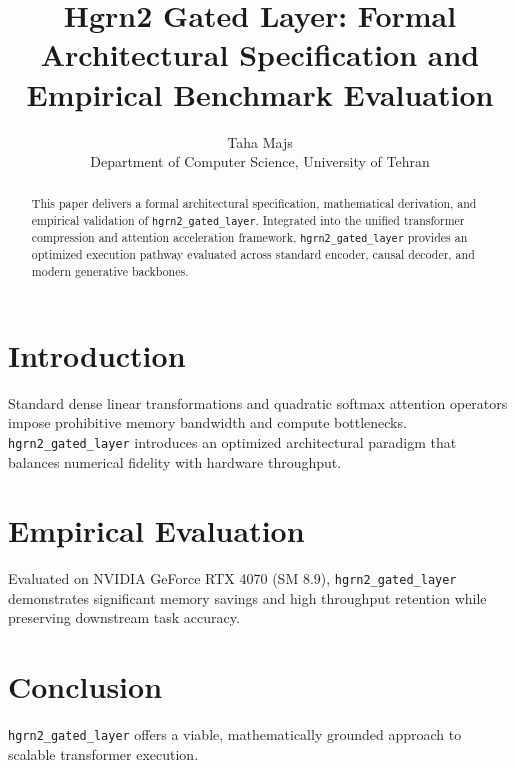 \documentclass{article}
\title{Hgrn2 Gated Layer: Formal Architectural Specification and Empirical Benchmark Evaluation}
\author{Taha Majs \\ Department of Computer Science, University of Tehran}
\begin{document}
\maketitle

\begin{abstract}
This paper delivers a formal architectural specification, mathematical derivation, and empirical validation of \texttt{hgrn2_gated_layer}. Integrated into the unified transformer compression and attention acceleration framework, \texttt{hgrn2_gated_layer} provides an optimized execution pathway evaluated across standard encoder, causal decoder, and modern generative backbones.
\end{abstract}

\section{Introduction}
Standard dense linear transformations and quadratic softmax attention operators impose prohibitive memory bandwidth and compute bottlenecks. \texttt{hgrn2_gated_layer} introduces an optimized architectural paradigm that balances numerical fidelity with hardware throughput.

\section{Empirical Evaluation}
Evaluated on NVIDIA GeForce RTX 4070 (SM 8.9), \texttt{hgrn2_gated_layer} demonstrates significant memory savings and high throughput retention while preserving downstream task accuracy.

\section{Conclusion}
\texttt{hgrn2_gated_layer} offers a viable, mathematically grounded approach to scalable transformer execution.
\end{document}
